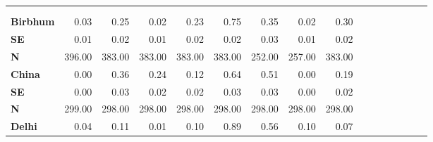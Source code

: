 \begin{tabular}{@{\extracolsep{5pt}}lrrrrrrrrrrrrrrr}
\toprule
&  &  &  &  &  &  &  &  \\
{\bf } &  &  &  &  &  &  &  &  \\
\hline
{\bf Birbhum} & 0.03\phantom{***} & 0.25\phantom{***} & 0.02\phantom{***} & 0.23\phantom{***} & 0.75\phantom{***} & 0.35\phantom{***} & 0.02\phantom{***} & 0.30\phantom{***} \\
{\bf SE} & 0.01\phantom{***} & 0.02\phantom{***} & 0.01\phantom{***} & 0.02\phantom{***} & 0.02\phantom{***} & 0.03\phantom{***} & 0.01\phantom{***} & 0.02\phantom{***} \\
{\bf N} & 396.00\phantom{***} & 383.00\phantom{***} & 383.00\phantom{***} & 383.00\phantom{***} & 383.00\phantom{***} & 252.00\phantom{***} & 257.00\phantom{***} & 383.00\phantom{***} \\
{\bf China} & 0.00\phantom{***} & 0.36\phantom{***} & 0.24\phantom{***} & 0.12\phantom{***} & 0.64\phantom{***} & 0.51\phantom{***} & 0.00\phantom{***} & 0.19\phantom{***} \\
{\bf SE} & 0.00\phantom{***} & 0.03\phantom{***} & 0.02\phantom{***} & 0.02\phantom{***} & 0.03\phantom{***} & 0.03\phantom{***} & 0.00\phantom{***} & 0.02\phantom{***} \\
{\bf N} & 299.00\phantom{***} & 298.00\phantom{***} & 298.00\phantom{***} & 298.00\phantom{***} & 298.00\phantom{***} & 298.00\phantom{***} & 298.00\phantom{***} & 298.00\phantom{***} \\
{\bf Delhi} & 0.04\phantom{***} & 0.11\phantom{***} & 0.01\phantom{***} & 0.10\phantom{***} & 0.89\phantom{***} & 0.56\phantom{***} & 0.10\phantom{***} & 0.07\phantom{***} \\

\end{tabular}
